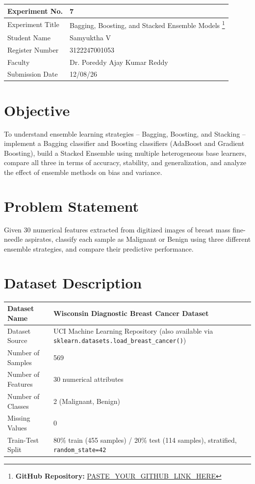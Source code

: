 \documentclass[12pt,a4paper]{article}
\begin{document}
\begin{tabular}{|p{4cm}|p{11cm}|}
\hline
Experiment No. & 7 \\ \hline
Experiment Title & Bagging, Boosting, and Stacked Ensemble Models
\footnote{\textbf{GitHub Repository: }\url{PASTE_YOUR_GITHUB_LINK_HERE}}\\ \hline
Student Name & Samyuktha V \\ \hline
Register Number & 3122247001053 \\ \hline
Faculty & Dr. Poreddy Ajay Kumar Reddy \\ \hline
Submission Date & 12/08/26 \\ \hline
\end{tabular}

\section{Objective}
To understand ensemble learning strategies -- Bagging, Boosting, and Stacking --
implement a Bagging classifier and Boosting classifiers (AdaBoost and Gradient
Boosting), build a Stacked Ensemble using multiple heterogeneous base learners,
compare all three in terms of accuracy, stability, and generalization, and analyze
the effect of ensemble methods on bias and variance.

\section{Problem Statement}
Given 30 numerical features extracted from digitized images of breast mass
fine-needle aspirates, classify each sample as Malignant or Benign using three
different ensemble strategies, and compare their predictive performance.

\section{Dataset Description}
\begin{longtable}{|p{6cm}|p{8cm}|}
\hline
Dataset Name & Wisconsin Diagnostic Breast Cancer Dataset \\ \hline
Dataset Source & UCI Machine Learning Repository (also available via
\texttt{sklearn.datasets.load\_breast\_cancer()}) \\ \hline
Number of Samples & 569 \\ \hline
Number of Features & 30 numerical attributes \\ \hline
Number of Classes & 2 (Malignant, Benign) \\ \hline
Missing Values & 0 \\ \hline
Train-Test Split & 80\% train (455 samples) / 20\% test (114 samples), stratified,
\texttt{random\_state=42} \\ \hline
\end{longtable}
\end{document}

